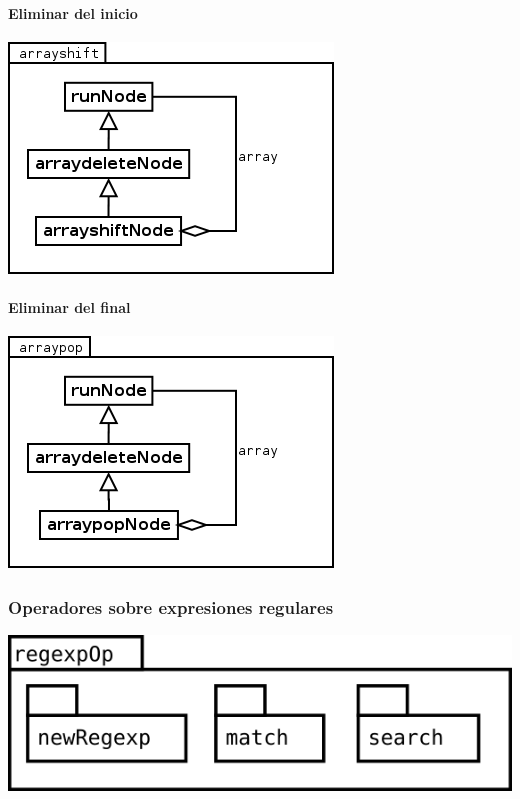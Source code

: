 \paragraph {Eliminar del inicio}
\begin{center}
\includegraphics[scale=0.4]{shift.png} \\
\end{center}

\paragraph {Eliminar del final}
\begin{center}
\includegraphics[scale=0.4]{pop.png} \\
\end{center}




\pagebreak
\subsubsection {Operadores sobre expresiones regulares}
\begin{center}
\includegraphics[scale=0.4]{regexpOp-package.png} \\
\end{center}

